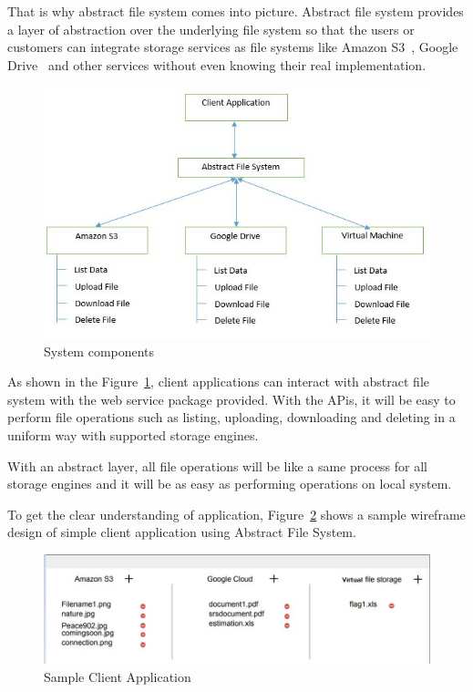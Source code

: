 That is why abstract file system comes into picture. Abstract file system
provides a layer of abstraction over the underlying file system so that the
users or customers can integrate storage services as file systems like 
Amazon S3~\cite{hid-sp18-420-amazon-S3}, 
Google Drive~\cite{hid-sp18-420-google-drive} and other services 
without even knowing their real implementation.



\begin{figure}[!ht]
        \centering\includegraphics[width=\columnwidth]
        {image/architecture.JPG}
        \caption{System components}\label{fig:architecture}
\end{figure}


As shown in the Figure~\ref{fig:architecture}, 
client applications can interact with abstract file 
system with the web service package provided. With the APis, it will be easy 
to perform file operations such as listing, uploading, downloading and 
deleting in a uniform way with supported storage engines. 

With an abstract layer, all file operations will be like a same process for 
all storage engines and it will be as easy as performing operations on local 
system. 


To get the clear understanding of application, Figure~\ref{fig:client} 
shows a sample wireframe 
design of simple client application using Abstract File System. 


\begin{figure}[!ht]
        \centering\includegraphics[width=\columnwidth]
        {image/client.JPG}
        \caption{Sample Client Application}\label{fig:client}
\end{figure}





